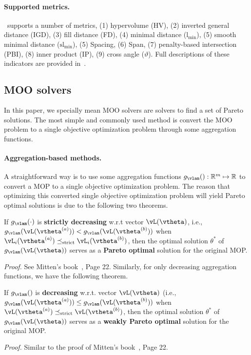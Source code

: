 \paragraph{Supported metrics.}
\algoname~supports a number of metrics, (1) hypervolume (HV), (2) inverted general distance (IGD), (3) fill distance (FD), (4) minimal distance ($\mathrm{l}_{\min}$), (5) smooth minimal distance ($\mathrm{sl}_{\min}$), (5) Spacing, (6) Span, (7) penalty-based intersection (PBI), (8) inner product (IP), (9) cross angle ($\vartheta$). Full descriptions of these indicators are provided in~.

\subsection{MOO solvers} \label{sec:moo_solvers}

In this paper, we specially mean MOO solvers are solvers to find a set of Pareto solutions. The most simple and commonly used method is convert the MOO problem to a single objective optimization problem through some aggregation functions. 
\paragraph{Aggregation-based methods.}
A straightforward way is to use some aggregation functions $g_\vlam(): \mathbb{R}^m \mapsto \mathbb{R}$ to convert a MOP to a single objective optimization problem. The reason that optimizing this converted single objective optimization problem will yield Pareto optimal solutions is due to the following two theorems.

\begin{theorem} \label{thm:po}
    If \( g_\vlam(\cdot) \) is \textbf{strictly decreasing} w.r.t vector \( \vL(\vtheta) \), i.e., \( g_\vlam(\vL(\vtheta^{(a)})) < g_\vlam(\vL(\vtheta^{(b)})) \) when \( \vL_i(\vtheta^{(a)}) \preceq_\mathrm{strict} \vL_i(\vtheta^{(b)}) \), then the optimal solution $\theta^*$ of \( g_\vlam(\vL(\vtheta)) \) serves as a \textbf{Pareto optimal} solution for the original MOP.
\end{theorem}
\textit{Proof.} See Mitten's book~\cite{miettinen1999nonlinear}, Page 22. Similarly, for only decreasing aggregation functions, we have the following theorem.
\begin{theorem} \label{thm:wpo}
    If \( g_\vlam() \) is \textbf{decreasing} w.r.t. vector $\vL(\vtheta)$ (i.e., $g_\vlam(\vL(\vtheta^{(a)})) \leq g_\vlam(\vL(\vtheta^{(b)}))$ when $\vL(\vtheta^{(a)}) \preceq_\mathrm{strict} \vL(\vtheta^{(b)})$, then the optimal solution $\theta^*$ of \( g_\vlam(\vL(\vtheta)) \) serves as a \textbf{weakly Pareto optimal} solution for the original MOP.
\end{theorem}
\textit{Proof.} Similar to the proof of Mitten's book~\cite{miettinen1999nonlinear}, Page 22. 

